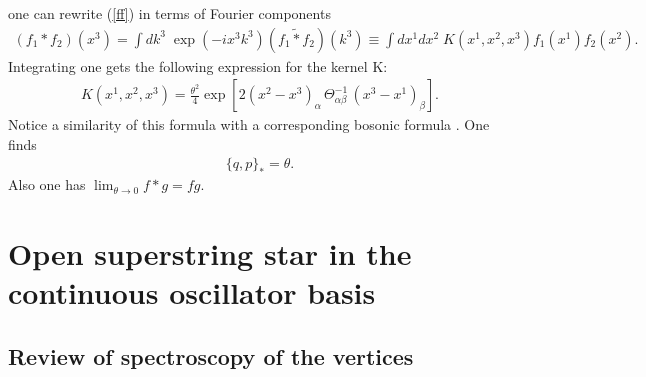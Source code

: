 \documentclass[a4paper,12pt]{article}
\begin{document}
one can rewrite  (\ref{ff}) in terms of Fourier components
\begin{gather}
(f_{1}*f_{2})(x^{3})=\int dk^3\; \exp(-ix^{3}k^3)(\widetilde{f_{1}*f_{2}})(k^3)
\equiv\int dx^{1}dx^{2}\;K(x^{1},x^{2},x^{3})f_{1}(x^{1})f_{2}(x^{2}).
\label{moyal-product}
\end{gather}
Integrating one gets the following expression for
the kernel K:
\begin{gather}
K(x^{1},x^{2},x^{3})
=\frac{\theta^{2}}{4}
\exp[2(x^{2}-x^{3})_{\alpha}\,\Theta^{-1}_{\alpha\beta}\,(x^{3}-x^{1})_{\beta}].
\label{kernel}
\end{gather}
Notice a similarity of this formula with a corresponding
bosonic formula \cite{0202087}.
One finds
\begin{gather}
\{q,p\}_{*}=\theta.
\end{gather}
Also one has $\lim _{\theta \to 0} f*g=fg$.


\section{Open superstring star in the continuous oscillator basis}
\label{sec:mpver}
\setcounter{equation}{0}
\subsection{Review of spectroscopy of the vertices}
\end{document}
